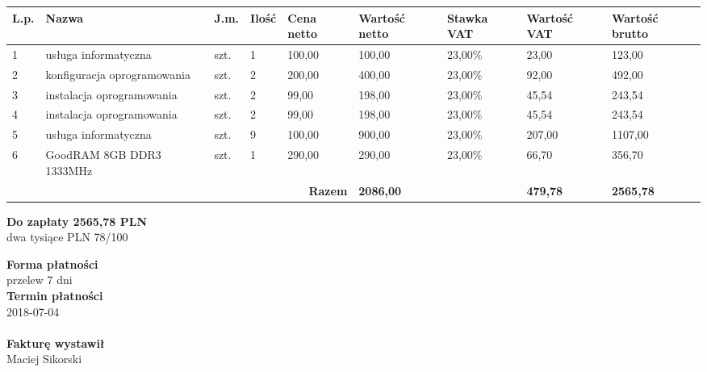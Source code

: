 \documentclass[a4paper,10pt]{article}
\begin{document}
    \begin{table}[H]
    \raggedleft
    \begin{tabular}{| p{} | p{}  | p{} | p{}| p{} | p{} | p{} | p{} | p{} |}
    \hline
    \textbf{L.p.} & \textbf{Nazwa} & \textbf{J.m.} & \textbf{Ilość} & \textbf{Cena netto} & \textbf{Wartość netto} & \textbf{Stawka VAT} & \textbf{Wartość VAT} & \textbf{Wartość brutto} \\ \hline
  
    1 & usługa informatyczna & szt. & 1 & 100,00 & 100,00 & 23,00\% & 23,00 & 123,00 \\ \hline
  
    2 & konfiguracja oprogramowania & szt. & 2 & 200,00 & 400,00 & 23,00\% & 92,00 & 492,00 \\ \hline
  
    3 & instalacja oprogramowania & szt. & 2 & 99,00 & 198,00 & 23,00\% & 45,54 & 243,54 \\ \hline
  
    4 & instalacja oprogramowania & szt. & 2 & 99,00 & 198,00 & 23,00\% & 45,54 & 243,54 \\ \hline
  
    5 & usługa informatyczna & szt. & 9 & 100,00 & 900,00 & 23,00\% & 207,00 & 1107,00 \\ \hline
  
    6 & GoodRAM 8GB DDR3 1333MHz & szt. & 1 & 290,00 & 290,00 & 23,00\% & 66,70 & 356,70 \\ \hline
  
    \hline
    \multicolumn{5}{|r|}{\textbf{Razem}} & \textbf{2086,00} & \cellcolor[gray]{0.9} & \textbf{479,78} & \textbf{2565,78} \\ \hline
    \end{tabular}
    \end{table}
  
  \noindent
  \begin{flushright}
  \textbf{\LARGE{Do zapłaty} 2565,78 PLN}\\
  dwa tysiące PLN 78/100
  \end{flushright}

  \vfill
  \noindent
  \textbf{Forma płatności}\\
  przelew 7 dni\\
  \textbf{Termin płatności}\\
  2018-07-04\\
  \\
  
  \noindent
    \textbf{Fakturę wystawił}\\
    Maciej Sikorski
    
\end{document}
